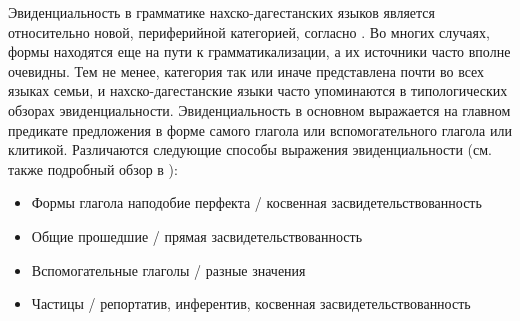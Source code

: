 \par Эвиденциальность в грамматике нахско-дагестанских языков является относительно новой, периферийной категорией, согласно \citep[ix]{authiermaisak2011}. Во многих случаях, формы находятся еще на пути к грамматикализации, а их источники часто вполне очевидны. Тем не менее, категория так или иначе представлена почти во всех языках семьи, и нахско-дагестанские языки часто упоминаются в типологических обзорах эвиденциальности. Эвиденциальность в основном выражается на главном предикате предложения в форме самого глагола или вспомогательного глагола или клитикой. Различаются следующие способы выражения эвиденциальности (см. также подробный обзор в \citep{forker2018evid}):

\begin{itemize}
    \item Формы глагола наподобие перфекта / косвенная засвидетельствованность
    \item Общие прошедшие / прямая засвидетельствованность
    \item Вспомогательные глаголы / разные значения
    \item Частицы / репортатив, инферентив, косвенная засвидетельствованность
\end{itemize}

